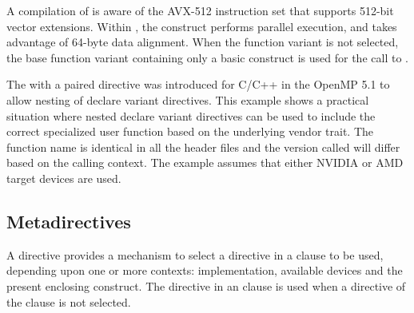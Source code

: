 A compilation of  is aware of
the AVX-512 instruction set that supports 512-bit vector extensions.
Within , the  construct performs parallel execution, and
takes advantage of 64-byte data alignment. 
When the  function variant is not selected, the base  function variant
containing only a basic  construct is used for the call to .




The  with a paired  directive was introduced 
for C/C++ in the OpenMP 5.1 to allow nesting of declare variant directives. 
This example shows a practical situation where nested declare variant directives can be used 
to include the correct specialized user function based on the underlying vendor  trait. 
The function name  is identical in all the header files and the version called will 
differ based on the calling context. The example assumes that either NVIDIA or AMD target devices are used. 



\subsection{Metadirectives}
\label{subsec:metadirective}

A  directive provides a mechanism to select a directive in
a  clause to be used, depending upon one or more contexts:  
implementation, available devices and the present enclosing construct. 
The directive in an  clause is used when a directive of the 
 clause is not selected.

